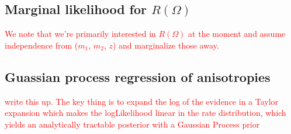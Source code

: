\documentclass{article}
\begin{document}
\subsection*{Marginal likelihood for $R(\Omega)$}

\textcolor{red}{We note that we're primarily interested in $R(\Omega)$ at the moment and assume independence from ($m_1$, $m_2$, $z$) and marginalize those away.}


\subsection*{Guassian process regression of anisotropies}

\textcolor{red}{write this up. The key thing is to expand the log of the evidence in a Taylor expansion which makes the logLikelihood linear in the rate distribution, which yields an analytically tractable posterior with a Gaussian Process prior}

\end{document}

